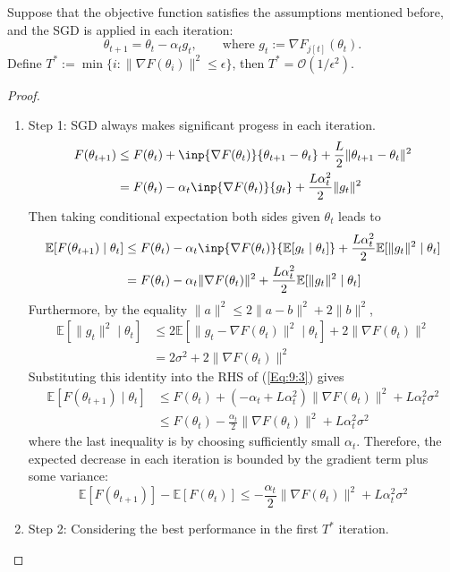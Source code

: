 \begin{theorem}
Suppose that the objective function satisfies the assumptions mentioned before, and the SGD is applied in each iteration:
\[
\theta_{t+1} = \theta_t-\alpha_tg_t,\qquad
\text{where }g_t:=\nabla F_{j[t]}(\theta_t).
\]
Define $T^*:=\min\{i: \|\nabla F(\theta_i)\|^2\le\epsilon\}$, then $T^*=\mathcal{O}(1/\epsilon^2)$. 
\end{theorem}

\begin{proof}
\begin{enumerate}
\item
Step 1: SGD always makes significant progess in each iteration.
\begin{align*}
F(\theta_{t+1})&\le F(\theta_t)+\inp{\nabla F(\theta_t)}{\theta_{t+1} - \theta_t} + \frac{L}{2}\|\theta_{t+1} - \theta_t\|^2\\
&=F(\theta_t)-\alpha_t\inp{\nabla F(\theta_t)}{g_t}+\frac{L\alpha_t^2}{2}\|g_t\|^2
\end{align*}
Then taking conditional expectation both sides given $\theta_t$ leads to
\begin{equation}\label{Eq:9:3}
\begin{aligned}
\mathbb{E}[F(\theta_{t+1})\mid \theta_t]&\le F(\theta_t)-\alpha_t\inp{\nabla F(\theta_t)}{\mathbb{E}[g_t\mid\theta_t]}+\frac{L\alpha_t^2}{2}\mathbb{E}[\|g_t\|^2\mid\theta_t]\\
&=F(\theta_t)-\alpha_t\|\nabla F(\theta_t)\|^2+\frac{L\alpha_t^2}{2}\mathbb{E}[\|g_t\|^2\mid\theta_t]
\end{aligned}
\end{equation}
Furthermore, by the equality $\|a\|^2\le 2\|a-b\|^2+2\|b\|^2$,
\begin{align*}
\mathbb{E}[\|g_t\|^2\mid\theta_t]&\le 2\mathbb{E}[\|g_t-\nabla F(\theta_t)\|^2\mid\theta_t]+2\|\nabla F(\theta_t)\|^2\\&
=2\sigma^2+2\|\nabla F(\theta_t)\|^2
\end{align*}
Substituting this identity into the RHS of (\ref{Eq:9:3}) gives
\begin{align*}
\mathbb{E}[F(\theta_{t+1})\mid \theta_t]&\le 
F(\theta_t)+\left(-\alpha_t+L\alpha_t^2\right)\|\nabla F(\theta_t)\|^2+L\alpha_t^2\sigma^2\\
&\le F(\theta_t)-\frac{\alpha_t}{2}\|\nabla F(\theta_t)\|^2+L\alpha_t^2\sigma^2
\end{align*}
where the last inequality is by choosing sufficiently small $\alpha_t$.
Therefore, the expected decrease in each iteration is bounded by the gradient term plus some variance:
\[
\mathbb{E}[F(\theta_{t+1})]-\mathbb{E}[F(\theta_{t})]\le -\frac{\alpha_t}{2}\|\nabla F(\theta_t)\|^2+L\alpha_t^2\sigma^2
\]
\item
Step 2: 
Considering the best performance in the first $T^*$ iteration.


\end{enumerate}
\end{proof}
